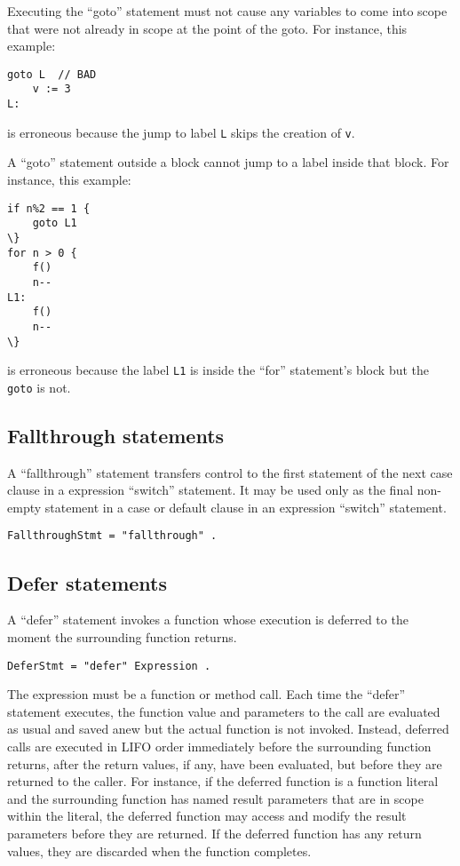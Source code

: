 Executing the ``goto'' statement must not cause any variables to come
into scope that were not already in
scope at the point of the goto. For instance, this example:

\begin{Verbatim}[frame=single]
    goto L  // BAD
    v := 3
L:
\end{Verbatim}

is erroneous because the jump to label \texttt{L} skips the creation of
\texttt{v}.

A ``goto'' statement outside a block cannot jump to a
label inside that block. For instance, this example:

\begin{Verbatim}[frame=single]
if n%2 == 1 {
    goto L1
\}
for n > 0 {
    f()
    n--
L1:
    f()
    n--
\}
\end{Verbatim}

is erroneous because the label \texttt{L1} is inside the ``for''
statement's block but the \texttt{goto} is not.

\subsection*{Fallthrough statements}

A ``fallthrough'' statement transfers control to the first statement of
the next case clause in a expression ``switch'' statement. It may be used
only as the final non-empty statement in a case or default clause in an
expression ``switch'' statement.

\begin{Verbatim}[frame=single]
FallthroughStmt = "fallthrough" .
\end{Verbatim}

\subsection*{Defer statements}

A ``defer'' statement invokes a function whose execution is deferred to
the moment the surrounding function returns.

\begin{Verbatim}[frame=single]
DeferStmt = "defer" Expression .
\end{Verbatim}

The expression must be a function or method call. Each time the
``defer'' statement executes, the function value and parameters to the
call are evaluated as usual and saved anew but the
actual function is not invoked. Instead, deferred calls are executed in
LIFO order immediately before the surrounding function returns, after
the return values, if any, have been evaluated, but before they are
returned to the caller. For instance, if the deferred function is a
function literal and the surrounding
function has named result parameters that
are in scope within the literal, the deferred function may access and
modify the result parameters before they are returned. If the deferred
function has any return values, they are discarded when the function
completes.

